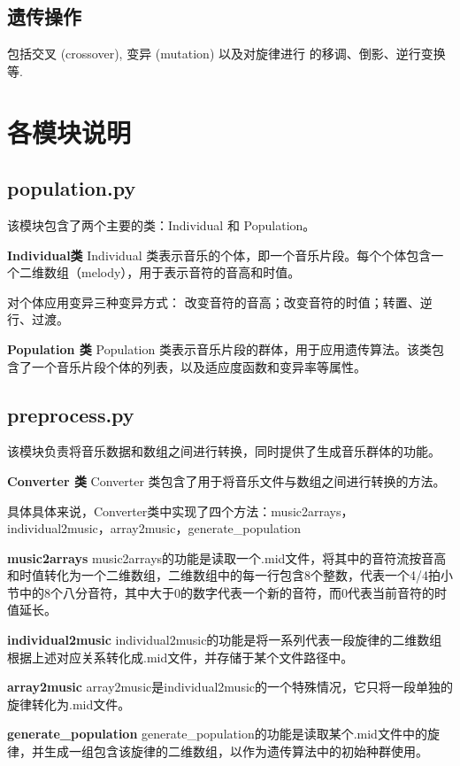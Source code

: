 \documentclass{article}
\begin{document}
\subsection{遗传操作}
包括交叉 (crossover), 变异 (mutation) 以及对旋律进行
的移调、倒影、逆行变换等.

\section{各模块说明}
\subsection{population.py}
该模块包含了两个主要的类：Individual 和 Population。

\textbf{Individual类}
\quad Individual 类表示音乐的个体，即一个音乐片段。每个个体包含一个二维数组（melody），用于表示音符的音高和时值。

对个体应用变异三种变异方式：
改变音符的音高；改变音符的时值；转置、逆行、过渡。

\textbf{Population 类}
\quad Population 类表示音乐片段的群体，用于应用遗传算法。该类包含了一个音乐片段个体的列表，以及适应度函数和变异率等属性。


\subsection{preprocess.py}
该模块负责将音乐数据和数组之间进行转换，同时提供了生成音乐群体的功能。

\textbf{Converter 类}
\quad Converter 类包含了用于将音乐文件与数组之间进行转换的方法。

具体具体来说，Converter类中实现了四个方法：music2arrays，individual2music，array2music，generate\_population

\textbf{music2arrays}
\quad music2arrays的功能是读取一个.mid文件，将其中的音符流按音高和时值转化为一个二维数组，二维数组中的每一行包含8个整数，代表一个4/4拍小节中的8个八分音符，其中大于0的数字代表一个新的音符，而0代表当前音符的时值延长。

\textbf{individual2music}
\quad individual2music的功能是将一系列代表一段旋律的二维数组根据上述对应关系转化成.mid文件，并存储于某个文件路径中。

\textbf{array2music}
\quad array2music是individual2music的一个特殊情况，它只将一段单独的旋律转化为.mid文件。

\textbf{generate\_population}
\quad generate\_population的功能是读取某个.mid文件中的旋律，并生成一组包含该旋律的二维数组，以作为遗传算法中的初始种群使用。
\end{document}
